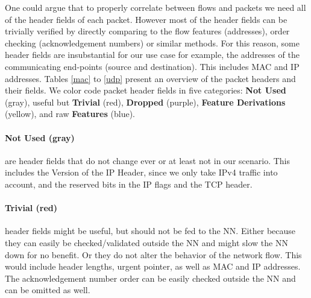 \documentclass[
	ngerman,
	ruledheaders=section,%
	class=report,%
	thesis={type=bachelor},%
	accentcolor=9c,%
	custommargins=true,%
	marginpar=false,%
	parskip=half-,%
	fontsize=11pt,%
]{tudapub}
\begin{document}
One could argue that to properly correlate between flows and packets we need all of the header fields of each packet.
However most of the header fields can be trivially verified by directly comparing to the flow features (addresses), order checking (acknowledgement numbers) or similar methods.
For this reason, some header fields are insubstantial for our use case for example, the addresses of the communicating end-points (source and destination).
This includes MAC and IP addresses.
Tables \ref{mac} to \ref{udp} present an overview of the packet headers and their fields.
We color code packet header fields in five categories:
\colorbox{not}{\textbf{{Not Used}} (gray)},
useful but \colorbox{trivial}{\textbf{Trivial} (red)},
\colorbox{dropped}{\textbf{Dropped} (purple)},
\colorbox{derivation}{\textbf{Feature Derivations} (yellow)},
and raw \colorbox{feature}{\textbf{Features} (blue)}.

\paragraph{\colorbox{not}{\textbf{{Not Used} (gray)}}} are header fields that do not change ever or at least not in our scenario.
This includes the Version of the IP Header, since we only take IPv4 traffic into account,
and the reserved bits in the IP flags and the TCP header.

\paragraph{\colorbox{trivial}{\textbf{Trivial} (red)}} header fields might be useful, but should not be fed to the NN.
Either because they can easily be checked/validated outside the NN and might slow the NN down for no benefit.
Or they do not alter the behavior of the network flow.
This would include header lengths, urgent pointer, as well as MAC and IP addresses.
The acknowledgement number order can be easily checked outside the NN and can be omitted as well.
\end{document}
